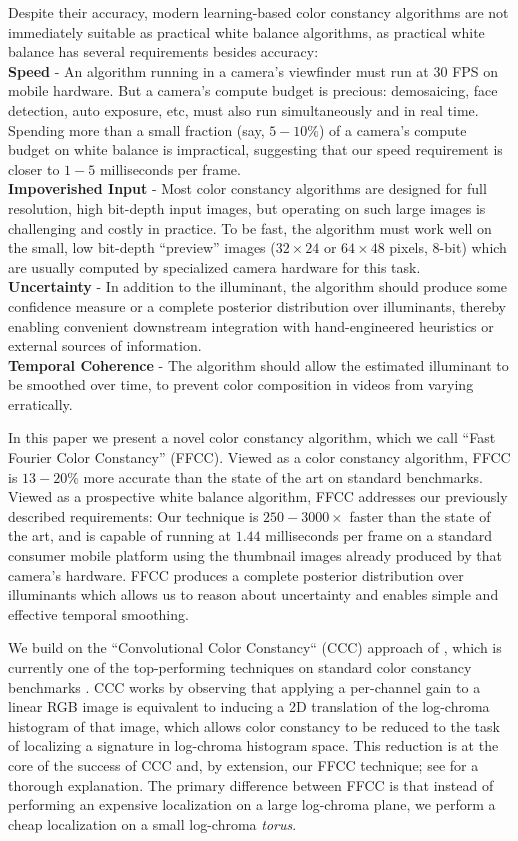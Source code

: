 \documentclass[10pt,twocolumn,letterpaper]{article}
\begin{document}
Despite their accuracy, modern learning-based color constancy algorithms are
not immediately suitable as practical white balance algorithms, as practical
white balance has several requirements besides accuracy:
\\ {\bf Speed} -
An algorithm running in a camera's viewfinder must run at $30$ FPS
on mobile hardware.
But a camera's compute budget is precious: demosaicing, face detection,
auto exposure, etc, must also run simultaneously and in real time.
Spending more than a small fraction (say, $5-10\%$) of a camera's
compute budget on white balance is impractical, suggesting that our speed
requirement is closer to $1-5$ milliseconds per frame.
\\ {\bf Impoverished Input} -
Most color constancy algorithms are designed for full resolution, high
bit-depth input images, but operating on such large images is challenging and
costly in practice.
To be fast, the algorithm must work well on the small, low bit-depth
``preview'' images ($32 \times 24$ or $64 \times 48$ pixels, $8$-bit)
which are usually computed by specialized camera hardware for this task.
\\ {\bf Uncertainty} -
In addition to the illuminant, the algorithm should produce
some confidence measure or a complete posterior distribution over
illuminants, thereby enabling convenient downstream integration with
hand-engineered heuristics or external sources of information.
\\ {\bf Temporal Coherence} -
The algorithm should allow the estimated illuminant to be smoothed over time,
to prevent color composition in videos from varying erratically.

In this paper we present a novel color constancy algorithm, which we call
``Fast Fourier Color Constancy'' (FFCC).
Viewed as a color constancy algorithm, FFCC is $13-20\%$ more accurate than the
state of the art on standard benchmarks.
Viewed as a prospective white balance algorithm, FFCC addresses our
previously described requirements: Our technique is
$250-3000\times$ faster than the state of the art, and is capable of running at
$1.44$ milliseconds per frame on a standard consumer mobile platform using the
thumbnail images already produced by that camera's hardware.
FFCC produces a complete posterior distribution over illuminants which allows
us to reason about uncertainty and enables simple and effective temporal smoothing.

We build on the ``Convolutional Color Constancy`` (CCC) approach
of \cite{BarronICCV2015}, which is
currently one of the top-performing techniques on standard color constancy
benchmarks \cite{Cheng14,Gehler08,shifunt}.
CCC works by observing that applying a per-channel gain to a linear RGB
image is equivalent to inducing a 2D translation of the log-chroma histogram
of that image, which allows color constancy to be reduced to the
task of localizing a signature in log-chroma histogram space.
This reduction is at the core of the success of CCC and, by extension,
our FFCC technique;
see \cite{BarronICCV2015} for a thorough explanation.
The primary difference between FFCC is that instead of performing an expensive
localization on a large log-chroma plane, we perform a cheap
localization on a small log-chroma \emph{torus}.
\end{document}
